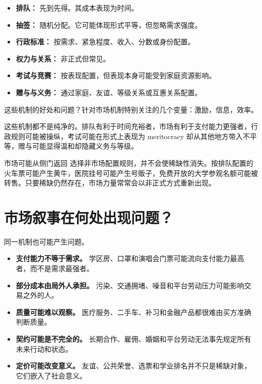 \documentclass[UTF8,10pt,a4paper,scheme=chinese]{ctexart}
\begin{document}
\begin{itemize}
  \item \textbf{排队：} 先到先得。其成本表现为时间。
  \item \textbf{抽签：} 随机分配。它可能体现形式平等，但忽略需求强度。
  \item \textbf{行政标准：} 按需求、紧急程度、收入、分数或身份配置。
  \item \textbf{权力与关系：} 非正式但常见。
  \item \textbf{考试与竞赛：} 按表现配置，但表现本身可能受到家庭资源影响。
  \item \textbf{赠与与义务：} 通过家庭、友谊、等级关系或互惠关系配置。
\end{itemize}

这些机制的好处和问题？针对市场机制特别关注的几个变量：激励，信息，效率。

这些机制都不是纯净的。排队有利于时间充裕者，市场有利于支付能力更强者，行政规则可能被操纵，考试可能在形式上表现为 meritocracy 却从其他地方带入不平等，赠与可能显得温和却隐藏义务与等级。

\begin{insightbox}{市场可能从侧门返回}
选择非市场配置规则，并不会使稀缺性消失。按排队配置的火车票可能产生黄牛，医院挂号可能产生号贩子，免费开放的大学参观名额可能被转售。只要稀缺仍然存在，市场力量常常会以非正式方式重新出现。
\end{insightbox}

\section{市场叙事在何处出现问题？}

同一机制也可能产生问题。

\begin{itemize}
  \item \textbf{支付能力不等于需求。} 学区房、口罩和演唱会门票可能流向支付能力最高者，而不是需求最强者。
  \item \textbf{部分成本由局外人承担。} 污染、交通拥堵、噪音和平台劳动压力可能影响交易之外的人。
  \item \textbf{质量可能难以观察。} 医疗服务、二手车、补习和金融产品都很难由买方准确判断质量。
  \item \textbf{契约可能是不完全的。} 长期合作、雇佣、婚姻和平台劳动无法事先规定所有未来行动和状态。
  \item \textbf{定价可能改变意义。} 友谊、公共荣誉、选票和学业排名并不只是稀缺对象，它们嵌入了社会意义。
\end{itemize}
\end{document}
